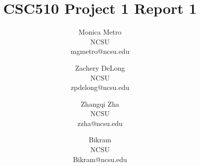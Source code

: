 \documentclass{article}
\begin{document}
\title{CSC510 Project 1 Report 1}
\date{} %

\author{
	{\large Monica Metro}\\NCSU\\mgmetro@ncsu.edu 
	\and {\large Zachery DeLong}\\NCSU\\zpdelong@ncsu.edu 
	\and {\large Zhangqi Zha}\\NCSU\\zzha@ncsu.edu
	\and {\large Bikram }\\NCSU\\Bikram@ncsu.edu }

\maketitle


















\end{document}

